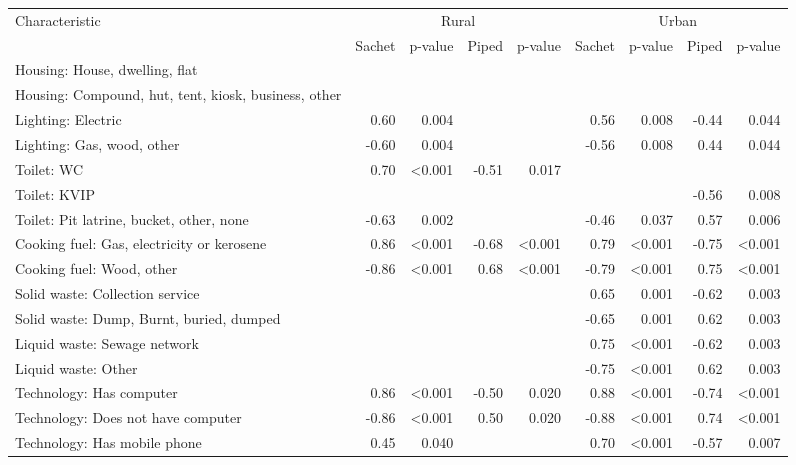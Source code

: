 \begin{tabular}{l r r r r r r r r}
\toprule
Characteristic & \multicolumn{4}{c}{Rural} & \multicolumn{4}{c}{Urban} \\
\cmidrule(lr){2-5}
\cmidrule(lr){6-9}
& Sachet & p-value & Piped & p-value & Sachet & p-value & Piped & p-value \\
\midrule
Housing: House, dwelling, flat  &    &    &    &    &    &    &    &    \\
Housing: Compound, hut, tent, kiosk, business, other  &    &    &    &    &    &    &    &    \\
Lighting: Electric  &  0.60  &  0.004  &    &    &  0.56  &  0.008  &  -0.44  &  0.044  \\
Lighting: Gas, wood, other  &  -0.60  &  0.004  &    &    &  -0.56  &  0.008  &  0.44  &  0.044  \\
Toilet: WC  &  0.70  &  \textless{}0.001  &  -0.51  &  0.017  &    &    &    &    \\
Toilet: KVIP  &    &    &    &    &    &    &  -0.56  &  0.008  \\
Toilet: Pit latrine, bucket, other, none  &  -0.63  &  0.002  &    &    &  -0.46  &  0.037  &  0.57  &  0.006  \\
Cooking fuel: Gas, electricity or kerosene  &  0.86  &  \textless{}0.001  &  -0.68  &  \textless{}0.001  &  0.79  &  \textless{}0.001  &  -0.75  &  \textless{}0.001  \\
Cooking fuel: Wood, other  &  -0.86  &  \textless{}0.001  &  0.68  &  \textless{}0.001  &  -0.79  &  \textless{}0.001  &  0.75  &  \textless{}0.001  \\
Solid waste: Collection service  &    &    &    &    &  0.65  &  0.001  &  -0.62  &  0.003  \\
Solid waste: Dump, Burnt, buried, dumped  &    &    &    &    &  -0.65  &  0.001  &  0.62  &  0.003  \\
Liquid waste: Sewage network  &    &    &    &    &  0.75  &  \textless{}0.001  &  -0.62  &  0.003  \\
Liquid waste: Other  &    &    &    &    &  -0.75  &  \textless{}0.001  &  0.62  &  0.003  \\
Technology: Has computer  &  0.86  &  \textless{}0.001  &  -0.50  &  0.020  &  0.88  &  \textless{}0.001  &  -0.74  &  \textless{}0.001  \\
Technology: Does not have computer  &  -0.86  &  \textless{}0.001  &  0.50  &  0.020  &  -0.88  &  \textless{}0.001  &  0.74  &  \textless{}0.001  \\
Technology: Has mobile phone  &  0.45  &  0.040  &    &    &  0.70  &  \textless{}0.001  &  -0.57  &  0.007  \\

\end{tabular}
